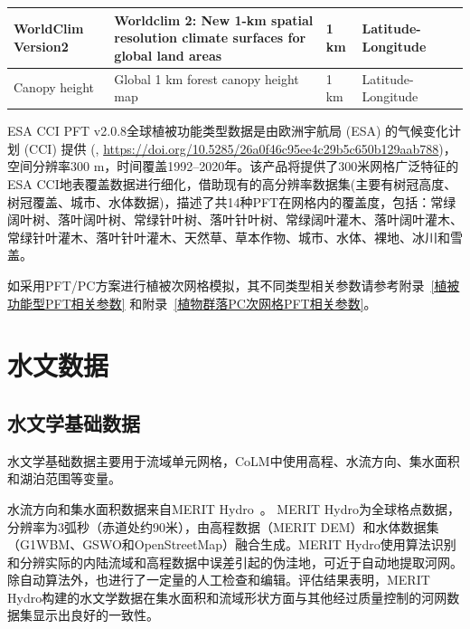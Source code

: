 \begin{landscape}
\begin{table}[htbp]
\begin{tabular}[h]{p{3cm}p{6cm}p{2cm}p{2cm}p{5cm}}
      WorldClim Version2                   & Worldclim 2: New 1-km spatial resolution climate surfaces for global land areas                 & 1 km   & Latitude-Longitude & \citet{fick2017worldclim}                                   \\ \midrule
      Canopy height                        & Global 1 km forest canopy height map                                                            & 1 km   & Latitude-Longitude & \citet{simard2011mapping}                                   \\ \bottomrule
    \end{tabular}
  \end{table}
\end{landscape}

ESA CCI PFT v2.0.8全球植被功能类型数据是由欧洲宇航局 (ESA) 的气候变化计划 (CCI) 提供  (\citet{harper202329yearTimeSeries}, \url{https://doi.org/10.5285/26a0f46c95ee4c29b5c650b129aab788})，空间分辨率300 m，时间覆盖1992--2020年。该产品将提供了300米网格广泛特征的ESA CCI地表覆盖数据进行细化，借助现有的高分辨率数据集(主要有树冠高度、树冠覆盖、城市、水体数据)，描述了共14种PFT在网格内的覆盖度，包括：常绿阔叶树、落叶阔叶树、常绿针叶树、落叶针叶树、常绿阔叶灌木、落叶阔叶灌木、常绿针叶灌木、落叶针叶灌木、天然草、草本作物、城市、水体、裸地、冰川和雪盖。

如采用PFT/PC方案进行植被次网格模拟，其不同类型相关参数请参考附录~\ref{植被功能型PFT相关参数} 和附录~\ref{植物群落PC次网格PFT相关参数}。%


\section{水文数据}\label{水文数据}

\subsection{水文学基础数据}
水文学基础数据主要用于流域单元网格，CoLM中使用高程、水流方向、集水面积和湖泊范围等变量。

水流方向和集水面积数据来自MERIT Hydro~\citep{yamazaki2019merit}。 MERIT Hydro为全球格点数据，分辨率为3弧秒（赤道处约90米），由高程数据（MERIT DEM）和水体数据集（G1WBM、GSWO和OpenStreetMap）融合生成。MERIT Hydro使用算法识别和分辨实际的内陆流域和高程数据中误差引起的伪洼地，可近于自动地提取河网。除自动算法外，也进行了一定量的人工检查和编辑。评估结果表明，MERIT Hydro构建的水文学数据在集水面积和流域形状方面与其他经过质量控制的河网数据集显示出良好的一致性。

